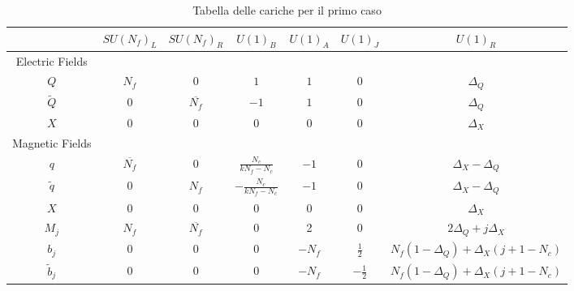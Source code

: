 \documentclass[a4paper,12pt]{article}
\begin{document}
\begin{table} [hb]
\centering
\begin{tabular}{|c |c |c |c |c |c |c |}
\hline
 & $SU(N_f)_L$ & $SU(N_f)_R$ & $U(1)_B$ & $U(1)_A$ & $U(1)_J$ & $U(1)_R $ \\
\hline
 Electric Fields  & & & & & & \\
\hline
$Q$ & $N_f$ & 0  &$ 1 $& $1 $& 0  & $\Delta_Q$ \\
$\tilde{Q} $  & 0  &$\overline{N_f}$ & $ - 1$& $1 $ & 0 & $\Delta_Q$ \\
$X$ & 0 & 0 & 0 & 0 &0 & $\Delta_X$ \\
\hline
Magnetic Fields & & & & & & \\
\hline 
$q$ & $\overline{N_f}$ & 0  & $\frac{N_c}{k N_f - N_c} $ & $-1 $ & 0  & $\Delta_X - \Delta_Q$ \\
$\tilde{q} $  & 0  &$N_f$ & $-\frac{N_c}{k N_f - N_c}$ & $- 1 $ & 0 &$\Delta_X - \Delta_Q$ \\
$X$ & 0 & 0 & 0 & 0 &0 & $\Delta_X$ \\ 
$M_j $ & $N_f$ & $\overline{N_f}$ & 0 & 2 & 0 & $2 \Delta_Q + j \Delta_X$\\ 
$b_j$ & 0  & 0 & 0  &  $ -N_f$ & $ \frac{1}{2}$   & $N_f ( 1 - \Delta_Q) + \Delta_X (j +1  - N_c) $ \\
 $\tilde{b} _j$ & 0  & 0 & 0  &  $ - N_f$ & $ - \frac{1}{2}$   & $N_f ( 1 - \Delta_Q) + \Delta_X (j +1 - N_c) $ \\
\hline
\end{tabular}
\caption{Tabella delle cariche per il primo caso}
\end{table}
\end{document}

